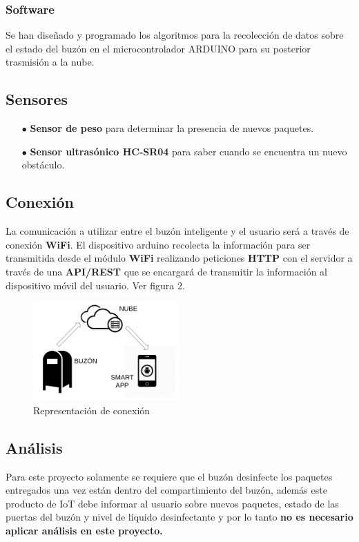 \documentclass[osajnl,twocolumn,showpacs,superscriptaddress,10pt]{revtex4-1}
\begin{document}
\subsubsection{Software}
    Se han diseñado y programado los algoritmos para la recolección de datos sobre el estado del buzón en el microcontrolador ARDUINO para su posterior trasmisión a la nube.
    
\subsection{Sensores}
\begin{itemize}
    \item[$\bullet$]\textbf{Sensor de peso} para determinar la presencia de nuevos paquetes.
    \item[$\bullet$]\textbf{Sensor ultrasónico HC-SR04} para saber cuando se encuentra un nuevo obstáculo.
\end{itemize}
\subsection{Conexión}
    La comunicación a utilizar entre el buzón inteligente y el usuario será a través de conexión \textbf{WiFi}. El dispositivo arduino recolecta la información para ser transmitida desde el módulo \textbf{WiFi} realizando peticiones \textbf{HTTP} con el servidor a través de una \textbf{API/REST} que se encargará de transmitir la información al dispositivo móvil del usuario. Ver figura 2. \newline
\begin{figure} [H] \centering 
\caption{Representación de conexión}

\includegraphics[width=0.5\textwidth]{conection.png} 
\end{figure}
\subsection{Análisis}
    Para este proyecto solamente se requiere que el buzón desinfecte los paquetes entregados una vez están dentro del compartimiento del buzón, además este producto de IoT debe informar al usuario sobre nuevos paquetes, estado de las puertas del buzón y nivel de líquido desinfectante y por lo tanto \textbf{no es necesario aplicar análisis en este proyecto.}
\end{document}
